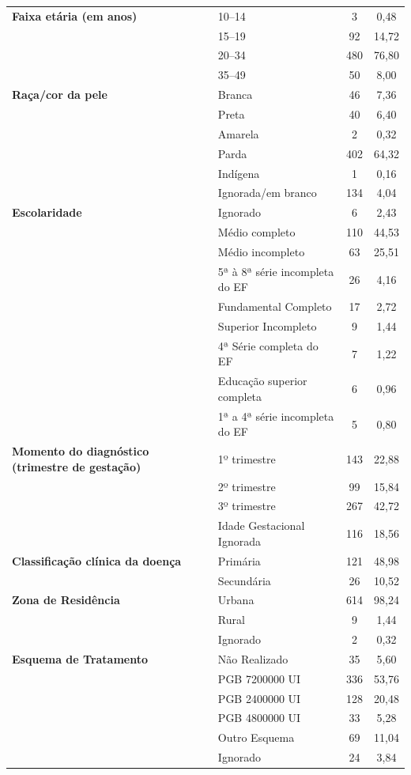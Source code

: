 \documentclass[a4paper]{article}
\begin{document}
\begin{multicols}
\begin{table}[htbp]
\begin{tabular}{@{}llcc@{}}
\textbf{Faixa etária (em anos)} 
& 10--14 & 3 & 0,48 \\
& 15--19 & 92 & 14,72 \\
& 20--34 & 480 & 76,80 \\
& 35--49 & 50 & 8,00 \\

\midrule
\textbf{Raça/cor da pele} & Branca & 46 & 7,36 \\
& Preta & 40 & 6,40 \\
& Amarela & 2 & 0,32 \\
& Parda & 402 & 64,32 \\
& Indígena & 1 & 0,16 \\
& Ignorada/em branco & 134 & 4,04 \\

\midrule
\textbf{Escolaridade} 
& Ignorado & 6 & 2,43 \\
& Médio completo & 110 & 44,53 \\
& Médio incompleto & 63 & 25,51 \\
& 5ª à 8ª série incompleta do EF & 26 & 4,16 \\
& Fundamental Completo & 17 & 2,72 \\
& Superior Incompleto & 9 & 1,44 \\
& 4ª Série completa do EF & 7 & 1,22 \\
& Educação superior completa & 6 & 0,96 \\
& 1ª a 4ª série incompleta do EF & 5 & 0,80 \\

\midrule
\textbf{Momento do diagnóstico (trimestre de gestação)} 
& 1º trimestre & 143 & 22,88 \\
& 2º trimestre & 99 & 15,84 \\
& 3º trimestre & 267 & 42,72 \\
& Idade Gestacional Ignorada & 116 & 18,56 \\

\midrule
\textbf{Classificação clínica da doença} & Primária & 121 & 48,98 \\
& Secundária & 26 & 10,52 \\

\midrule
\textbf{Zona de Residência} 
& Urbana & 614 & 98,24 \\
& Rural & 9 & 1,44 \\ 
& Ignorado & 2 & 0,32\\

\midrule
\textbf{Esquema de Tratamento} 
& Não Realizado & 35 & 5,60 \\
& PGB 7200000 UI & 336 & 53,76 \\ 
& PGB 2400000 UI & 128 & 20,48\\ 
& PGB 4800000 UI & 33 & 5,28\\ 
& Outro Esquema & 69 & 11,04\\ 
& Ignorado & 24 & 3,84\\


\end{tabular}
\end{table}
\end{multicols}
\end{document}
